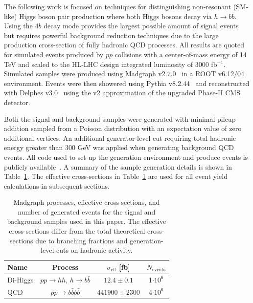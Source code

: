 The following work is focused on techniques for distinguishing non-resonant (SM-like) Higgs boson pair production where both Higgs bosons decay via $h \to b \bar{b}$. Using the $4b$ decay mode provides the largest possible amount of signal events but requires powerful background reduction techniques due to the large production cross-section of fully hadronic QCD processes. All results are quoted for simulated events produced by $pp$ collisions with a center-of-mass energy of 14 TeV and scaled to the HL-LHC design integrated luminosity of 3000 fb$^{-1}$. Simulated samples were produced using Madgraph v2.7.0~\cite{Alwall:2014hca} in a ROOT v6.12/04~\cite{Brun:1997pa} environment. Events were then showered using Pythia v8.2.44~\cite{Sj_strand_2015} and reconstructed with Delphes v3.0~\cite{de_Favereau_2014} using the v2 approximation of the upgraded Phase-II CMS detector.

Both the signal and background samples were generated with minimal pileup addition sampled from a Poisson distribution with an expectation value of zero additional vertices. An additional generator-level cut requiring total hadronic energy greater than 300 GeV was applied when generating background QCD events. All code used to set up the generation environment and produce events is publicly available~\cite{github}. A summary of the sample generation details is shown in Table~\ref{tab:samples}. The effective cross-sections in Table~\ref{tab:samples} are used for all event yield calculations in subsequent sections.

\begin{table}[ht!]
 \label{tab:samples}
\centering
    \begin{tabular}{|l|c|c|c|} %
      \hline\hline
      Name & Process & $\sigma_{\textrm{eff}}$ [fb] & $N_{\textrm{events}}$ \\
      \hline
      Di-Higgs & $p p \rightarrow h h$, $h \rightarrow b \bar{b}$ & $12.4 \pm 0.1$ & 1$\cdot 10^6$ \\
      QCD     & $p p \rightarrow b \bar{b} b \bar{b}$ & $441900 \pm 2300$ & 4$\cdot 10^6$ \\
      \hline\hline
    \end{tabular}
\caption{Madgraph processes, effective cross-sections, and number of generated events for the signal and background samples used in this paper. The effective cross-sections differ from the total theoretical cross-sections due to branching fractions and generation-level cuts on hadronic activity.}
\end{table}

